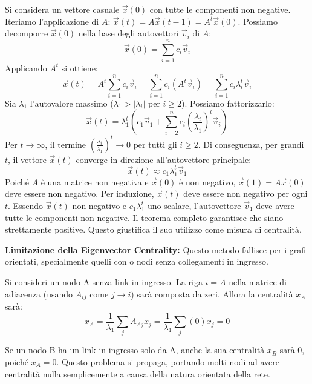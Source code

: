	Si considera un vettore casuale $\vec{x}(0)$ con tutte le componenti non negative.
	Iteriamo l'applicazione di $A$: $\vec{x}(t) = A \vec{x}(t-1) = A^t \vec{x}(0)$.
	Possiamo decomporre $\vec{x}(0)$ nella base degli autovettori $\vec{v}_i$ di $A$:
    \begin{equation}
        \vec{x}(0) = \sum_{i=1}^n c_i \vec{v}_i
    \end{equation}
    Applicando $A^t$ si ottiene:
    \begin{equation}
        \vec{x}(t) = A^t \sum_{i=1}^n c_i \vec{v}_i = \sum_{i=1}^n c_i (A^t \vec{v}_i) = \sum_{i=1}^n c_i \lambda_i^t \vec{v}_i
    \end{equation}
	Sia $\lambda_1$ l'autovalore massimo ($\lambda_1 > |\lambda_i|$ per $i \ge 2$). Possiamo fattorizzarlo:
    \begin{equation}
      \vec{x}(t) = \lambda_1^t \left( c_1 \vec{v}_1 + \sum_{i=2}^n c_i \left(\frac{\lambda_i}{\lambda_1}\right)^t \vec{v}_i \right)  
    \end{equation}
	Per $t \to \infty$, il termine $\left(\frac{\lambda_i}{\lambda_1}\right)^t \to 0$ per tutti gli $i \ge 2$.
	Di conseguenza, per grandi $t$, il vettore $\vec{x}(t)$ converge in direzione all'autovettore principale:
    \begin{equation}
        \vec{x}(t) \approx c_1 \lambda_1^t \vec{v}_1
    \end{equation}
	Poiché $A$ è una matrice non negativa e $\vec{x}(0)$ è non negativo, $\vec{x}(1) = A\vec{x}(0)$ deve essere non negativo. Per induzione, $\vec{x}(t)$ deve essere non negativo per ogni $t$.
	Essendo $\vec{x}(t)$ non negativo e $c_1 \lambda_1^t$ uno scalare, l'autovettore $\vec{v}_1$ deve avere tutte le componenti non negative. Il teorema completo garantisce che siano strettamente positive. Questo giustifica il suo utilizzo come misura di centralità.

\hfill 

   \noindent  \textbf{Limitazione della Eigenvector Centrality:} Questo metodo fallisce per i grafi orientati, specialmente quelli con o nodi senza collegamenti in ingresso.
	
	Si consideri un nodo A senza link in ingresso. La riga $i=A$ nella matrice di adiacenza (usando $A_{ij}$ come $j \to i$) sarà composta da zeri.
	Allora la centralità $x_A$ sarà:
	$$x_A = \frac{1}{\lambda_1} \sum_{j} A_{Aj} x_j = \frac{1}{\lambda_1} \sum_{j} (0) x_j = 0$$
	
	Se un nodo B ha un link in ingresso solo da A, anche la sua centralità $x_B$ sarà 0, poiché $x_A=0$. Questo problema si propaga, portando molti nodi ad avere centralità nulla semplicemente a causa della natura orientata della rete.
    
